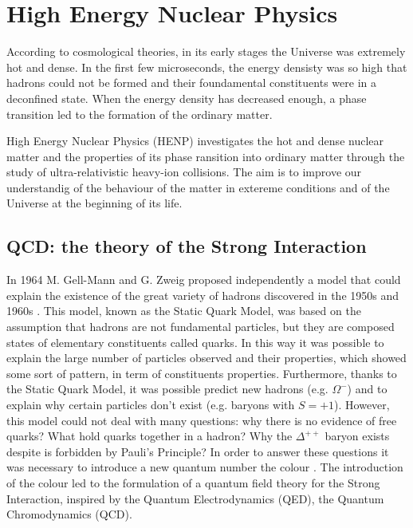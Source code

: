 %
\chapter{High Energy Nuclear Physics}
\label{sec:1}



According to cosmological theories, in its early stages the Universe was extremely hot and dense.
In the first few microseconds, the energy densisty was so high that hadrons could not be formed and
their foundamental constituents were in a deconfined state. When the energy density has decreased
enough, a phase transition led to the formation of the ordinary matter. 

High Energy Nuclear Physics (HENP) investigates the hot and dense nuclear matter and the properties
of its phase ransition into ordinary matter through the study of ultra-relativistic heavy-ion collisions. 
The aim is to improve our understandig of the behaviour of the matter in extereme conditions and of the
Universe at the beginning of its life.

\section{QCD: the theory of the Strong Interaction}
\label{sec:1.1}

In 1964 M. Gell-Mann and G. Zweig proposed independently a model that could explain the existence of
the great variety of hadrons discovered in the 1950s and 1960s \cite{gellmann, zweig1, zweig2}. 
This model, known as the Static Quark Model, was based on the assumption that hadrons are not
fundamental particles, but they are composed states of elementary constituents called quarks.
In this way it was possible to explain the large number of particles observed and their properties,
which showed some sort of pattern, in term of constituents properties.
Furthermore, thanks to the Static Quark Model, it was possible predict new hadrons (e.g. 
$\Omega^{-}\xspace$) and to explain why certain particles don't exist (e.g. baryons with $S=+1$).
However, this model could not deal with many questions: why there is no evidence of free quarks?
What hold quarks together in a hadron? Why the $\Delta^{++}$ baryon exists despite is forbidden
by Pauli's Principle?
In order to answer these questions it was necessary to introduce a new quantum number the colour
\cite{fritzsch-gellmann}. The introduction of the colour led to the formulation of a quantum field theory
for the Strong Interaction, inspired by the Quantum Electrodynamics (QED), the Quantum Chromodynamics
(QCD).

